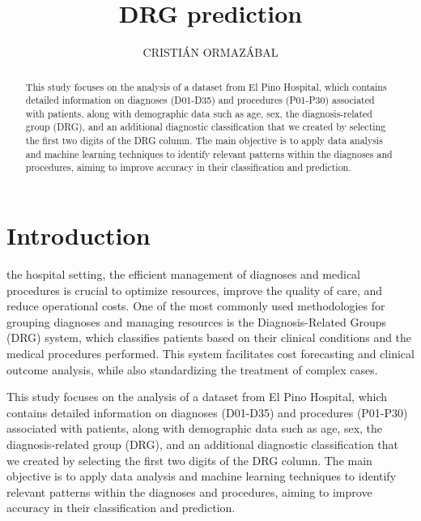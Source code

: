 \documentclass{ieeeaccess}
\begin{document}

\title{DRG prediction}
\author{\uppercase{Cristián Ormazábal}}
\address[1]{Ormasoft EIRL (e-mail: cristian@ormasoft.cl)}
\address[2]{Candidate to Master of computing (e-mail: c.ormazabalortega@uandresbello.edu)}

\begin{abstract}
This study focuses on the analysis of a dataset from El Pino Hospital, which contains detailed information on diagnoses (D01-D35) and procedures (P01-P30) associated with patients, along with demographic data such as age, sex, the diagnosis-related group (DRG), and an additional diagnostic classification that we created by selecting the first two digits of the DRG column. The main objective is to apply data analysis and machine learning techniques to identify relevant patterns within the diagnoses and procedures, aiming to improve accuracy in their classification and prediction.
\end{abstract}

\titlepgskip=-15pt

\maketitle

\section{Introduction}
\label{sec:introduction}
 the hospital setting, the efficient management of diagnoses and medical procedures is crucial to optimize resources, improve the quality of care, and reduce operational costs. One of the most commonly used methodologies for grouping diagnoses and managing resources is the Diagnosis-Related Groups (DRG) system, which classifies patients based on their clinical conditions and the medical procedures performed. This system facilitates cost forecasting and clinical outcome analysis, while also standardizing the treatment of complex cases.

This study focuses on the analysis of a dataset from El Pino Hospital, which contains detailed information on diagnoses (D01-D35) and procedures (P01-P30) associated with patients, along with demographic data such as age, sex, the diagnosis-related group (DRG), and an additional diagnostic classification that we created by selecting the first two digits of the DRG column. The main objective is to apply data analysis and machine learning techniques to identify relevant patterns within the diagnoses and procedures, aiming to improve accuracy in their classification and prediction.
\end{document}
